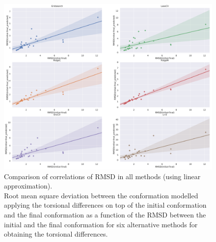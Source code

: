 \documentclass[12pt,twoside]{article}
\begin{document}
\begin{center}

\begin{figure}[h]
\centering
\includegraphics[width=1\textwidth]{Win.pdf}
\caption{Comparison of correlations of RMSD in all methods (using linear approximation). \\Root mean square deviation between the conformation modelled applying the torsional
differences on top of the initial conformation and the final conformation as a function of the RMSD between the
initial and the final conformation for six alternative methods for obtaining the torsional differences. }
\label{fig:hist2}
\end{figure} 

\end{center}
\clearpage
 
 
        
\end{document}
